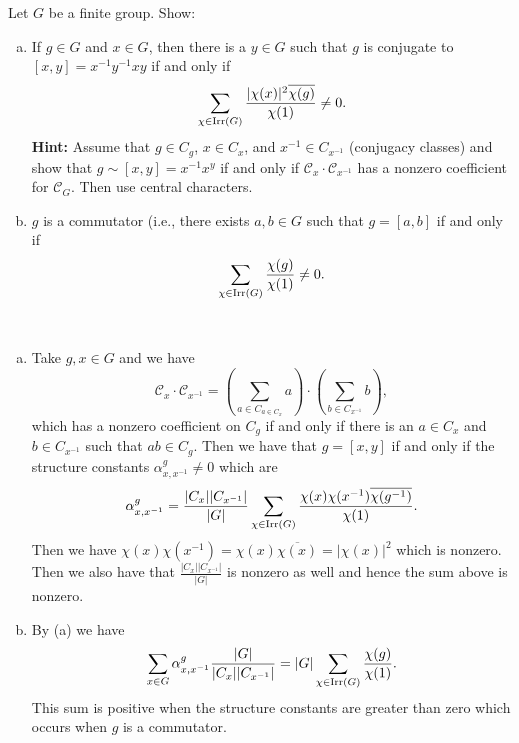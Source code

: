 \documentclass[leqno]{article}
\begin{document}
\newpage
\begin{problem} 
Let $G$ be a finite group. Show:
\begin{enumerate}[(a)]
    \item If $g\in G$ and $x\in G$, then there is a $y\in G$ such that $g$ is conjugate to $[x,y]=x^{-1}y^{-1}xy$ if and only if
    \[
    \sum_{\chi\in \mathrm{Irr}(G)} \frac{|\chi(x)|^2 \overline{\chi(g)}}{\chi(1)}\neq 0.
    \]
    \textbf{Hint:} Assume that $g\in C_g$, $x\in C_x$, and $x^{-1}\in C_{x^{-1}}$ (conjugacy classes) and show that $g\sim [x,y]=x^{-1}x^y$ if and only if $\mathcal{C}_x \cdot \mathcal{C}_{x^{-1}}$ has a nonzero coefficient for $\mathcal{C}_G$. Then use central characters.
    \item $g$ is a commutator (i.e., there exists $a,b\in G$ such that $g=[a,b]$ if and only if
    \[
    \sum_{\chi\in \mathrm{Irr}(G)} \frac{\chi(g)}{\chi(1)}\neq 0.
    \]
\end{enumerate}
\end{problem}
\begin{solution}~
\begin{enumerate}[(a)]
    \item Take $g,x \in G$ and we have
    \[
    \mathcal{C}_x \cdot \mathcal{C}_{x^{-1}} = \left( \sum_{a \in C_{a \in C_x}} a\right)\cdot \left( \sum_{b\in C_{x^{-1}}}b\right),
    \]
    which has a nonzero coefficient on $C_g$ if and only if there is an $a\in C_x$ and $b\in C_{x^{-1}}$ such that $ab\in C_g$. Then we have that $g=[x,y]$ if and only if the structure constants $\alpha_{x,x^{-1}}^g \neq 0$ which are
    \[
    \alpha_{x,x^{-1}}^g = \frac{|C_x||C_{x^{-1}}|}{|G|}\sum_{\chi\in \mathrm{Irr}(G)} \frac{\chi(x)\chi(x^{-1})\overline{\chi(g^{-1})}}{\chi(1)}.
    \]
    Then we have $\chi(x)\chi(x^{-1})=\chi(x)\overline{\chi(x)}=|\chi(x)|^2$ which is nonzero. Then we also have that $\frac{|C_x||C_{x^{-1}}|}{|G|}$ is nonzero as well and hence the sum above is nonzero.
    \item By (a) we have
    \[
    \sum_{x\in G} \alpha_{x,x^{-1}}^g \frac{|G|}{|C_x||C_{x^{-1}}|}=|G|\sum_{\chi \in \mathrm{Irr}(G)}\frac{\chi(g)}{\chi(1)}.
    \]
    This sum is positive when the structure constants are greater than zero which occurs when $g$ is a commutator.
\end{enumerate}
\end{solution}
\end{document}
